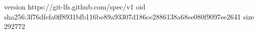 version https://git-lfs.github.com/spec/v1
oid sha256:3f76dfefa0ff8931bfb116be89a93307d186ce2886138a68ee080f9097ee2641
size 292772
